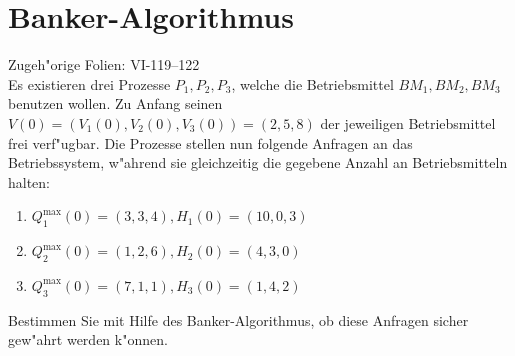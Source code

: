 \section{Banker-Algorithmus}

Zugeh"orige Folien: VI-119--122 \\

Es existieren drei Prozesse $P_1, P_2, P_3$, welche die Betriebsmittel
$BM_1, BM_2, BM_3$ benutzen wollen.  Zu Anfang seinen $V(0) = (V_1(0),
V_2(0), V_3(0)) = (2, 5, 8)$ der jeweiligen Betriebsmittel frei
verf"ugbar.  Die Prozesse stellen nun folgende Anfragen an das
Betriebssystem, w"ahrend sie gleichzeitig die gegebene Anzahl an
Betriebsmitteln halten:

\begin{enumerate}
\item $Q_1^\text{max}(0) = (3, 3, 4), H_1(0) = (10, 0, 3)$
\item $Q_2^\text{max}(0) = (1, 2, 6), H_2(0) = (4, 3, 0)$
\item $Q_3^\text{max}(0) = (7, 1, 1), H_3(0) = (1, 4, 2)$
\end{enumerate}

Bestimmen Sie mit Hilfe des Banker-Algorithmus, ob diese Anfragen
sicher gew"ahrt werden k"onnen.
